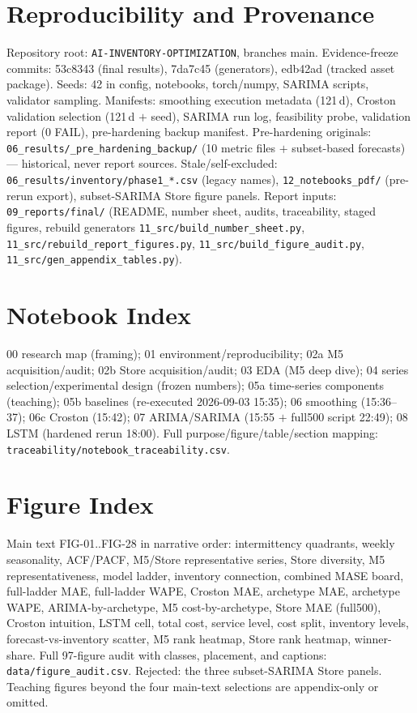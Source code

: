 \section{Reproducibility and Provenance}
\label{app:repro}
Repository root: \texttt{AI-INVENTORY-OPTIMIZATION}, branches main.
Evidence-freeze commits: 53c8343 (final results), 7da7c45 (generators),
edb42ad (tracked asset package). Seeds: 42 in config, notebooks, torch/numpy,
SARIMA scripts, validator sampling. Manifests: smoothing execution metadata
(121\,d), Croston validation selection (121\,d $+$ seed), SARIMA run log,
feasibility probe, validation report (0 FAIL), pre-hardening backup manifest.
Pre-hardening originals: \texttt{06\_results/\_pre\_hardening\_backup/} (10
metric files $+$ subset-based forecasts) --- historical, never report sources.
Stale/self-excluded: \texttt{06\_results/inventory/phase1\_*.csv} (legacy
names), \texttt{12\_notebooks\_pdf/} (pre-rerun export), subset-SARIMA Store
figure panels. Report inputs: \texttt{09\_reports/final/} (README, number
sheet, audits, traceability, staged figures, rebuild generators
\texttt{11\_src/build\_number\_sheet.py},
\texttt{11\_src/rebuild\_report\_figures.py},
\texttt{11\_src/build\_figure\_audit.py},
\texttt{11\_src/gen\_appendix\_tables.py}).

\section{Notebook Index}
\label{app:notebooks}
00 research map (framing); 01 environment/reproducibility; 02a M5
acquisition/audit; 02b Store acquisition/audit; 03 EDA (M5 deep dive); 04
series selection/experimental design (frozen numbers); 05a time-series
components (teaching); 05b baselines (re-executed 2026-09-03 15:35); 06
smoothing (15:36--37); 06c Croston (15:42); 07 ARIMA/SARIMA (15:55 $+$ full500
script 22:49); 08 LSTM (hardened rerun 18:00). Full purpose/figure/table/section
mapping: \texttt{traceability/notebook\_traceability.csv}.

\section{Figure Index}
\label{app:figures}
Main text FIG-01..FIG-28 in narrative order: intermittency quadrants, weekly
seasonality, ACF/PACF, M5/Store representative series, Store diversity, M5
representativeness, model ladder, inventory connection, combined MASE board,
full-ladder MAE, full-ladder WAPE, Croston MAE, archetype MAE, archetype WAPE,
ARIMA-by-archetype, M5 cost-by-archetype, Store MAE (full500), Croston
intuition, LSTM cell, total cost, service level, cost split, inventory levels,
forecast-vs-inventory scatter, M5 rank heatmap, Store rank heatmap,
winner-share. Full 97-figure audit with classes, placement, and captions:
\texttt{data/figure\_audit.csv}. Rejected: the three subset-SARIMA Store
panels. Teaching figures beyond the four main-text selections are
appendix-only or omitted.

